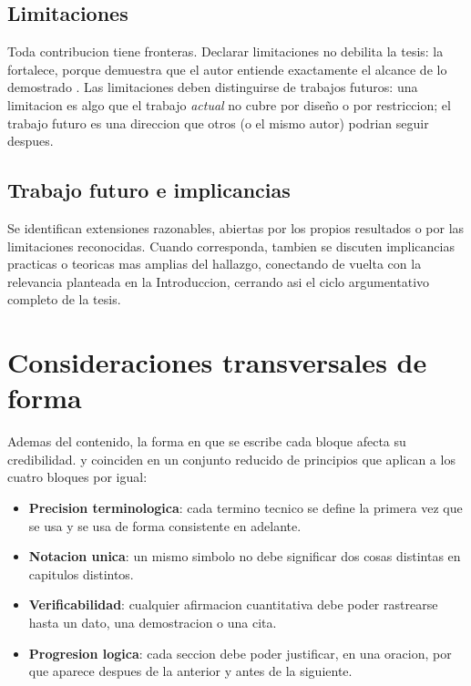 \documentclass[11pt]{article}
\begin{document}
\subsection{Limitaciones}

Toda contribucion tiene fronteras. Declarar limitaciones no debilita la
tesis: la fortalece, porque demuestra que el autor entiende exactamente el
alcance de lo demostrado \citep{booth2016craft}. Las limitaciones deben
distinguirse de trabajos futuros: una limitacion es algo que el trabajo
\emph{actual} no cubre por diseño o por restriccion; el trabajo futuro es
una direccion que otros (o el mismo autor) podrian seguir despues.

\subsection{Trabajo futuro e implicancias}

Se identifican extensiones razonables, abiertas por los propios resultados o
por las limitaciones reconocidas. Cuando corresponda, tambien se discuten
implicancias practicas o teoricas mas amplias del hallazgo, conectando de
vuelta con la relevancia planteada en la Introduccion, cerrando asi el
ciclo argumentativo completo de la tesis.

\section{Consideraciones transversales de forma}

Ademas del contenido, la forma en que se escribe cada bloque afecta su
credibilidad. \citet{zobel2014writing} y \citet{knuth1989mathematical}
coinciden en un conjunto reducido de principios que aplican a los cuatro
bloques por igual:

\begin{itemize}
  \item \textbf{Precision terminologica}: cada termino tecnico se define la
  primera vez que se usa y se usa de forma consistente en adelante.
  \item \textbf{Notacion unica}: un mismo simbolo no debe significar dos
  cosas distintas en capitulos distintos.
  \item \textbf{Verificabilidad}: cualquier afirmacion cuantitativa debe
  poder rastrearse hasta un dato, una demostracion o una cita.
  \item \textbf{Progresion logica}: cada seccion debe poder justificar, en
  una oracion, por que aparece despues de la anterior y antes de la
  siguiente.
\end{itemize}
\end{document}
